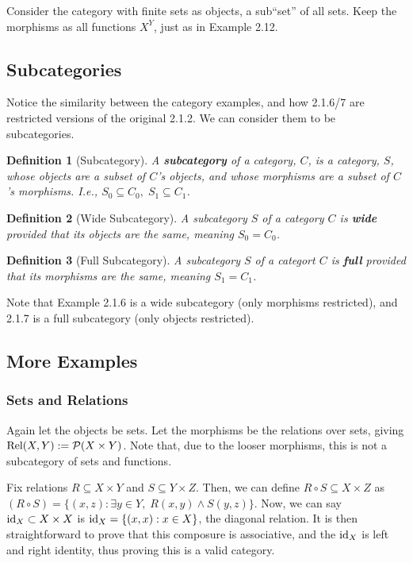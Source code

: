 \documentclass[12pt]{article}
\newtheorem{definition}{Definition}
\begin{document}
Consider the category with finite sets as objects, a sub``set'' of all sets. Keep the morphisms as all functions $X^Y$, just as in Example 2.12.

\subsection{Subcategories}

Notice the similarity between the category examples, and how 2.1.6/7 are restricted versions of the original 2.1.2. We can consider them to be subcategories.

\begin{definition}[Subcategory]
    A \textbf{subcategory} of a category, $C$, is a category, $S$, whose objects are a subset of $C$'s objects, and whose morphisms are a subset of $C$'s morphisms. I.e., $S_0 \subseteq C_0, \; S_1 \subseteq C_1$.
\end{definition}

\begin{definition}[Wide Subcategory]
    A subcategory $S$ of a category $C$ is \textbf{wide} provided that its objects are the same, meaning $S_0 = C_0$.
\end{definition}

\begin{definition}[Full Subcategory]
    A subcategory $S$ of a categort $C$ is \textbf{full} provided that its morphisms are the same, meaning $S_1 = C_1$.
\end{definition}

Note that Example 2.1.6 is a wide subcategory (only morphisms restricted), and 2.1.7 is a full subcategory (only objects restricted).


\subsection{More Examples}

\subsubsection{Sets and Relations}
Again let the objects be sets. Let the morphisms be the relations over sets, giving $\textmd{Rel}(X,Y) := \mathcal{P}(X \times Y)$. Note that, due to the looser morphisms, this is not a subcategory of sets and functions.

Fix relations $R \subseteq X \times Y$ and $S \subseteq Y \times Z$. Then, we can define $R \circ S \subseteq X \times Z$ as $(R \circ S) = \{(x,z): \exists y \in Y, \; R(x,y) \land S(y,z)\}$. Now, we can say $\textmd{id}_X \subset X \times X$ is $\textmd{id}_X = \{(x,x):x \in X\}$, the diagonal relation. It is then straightforward to prove that this composure is associative, and the $\textmd{id}_X$ is left and right identity, thus proving this is a valid category.
\end{document}
